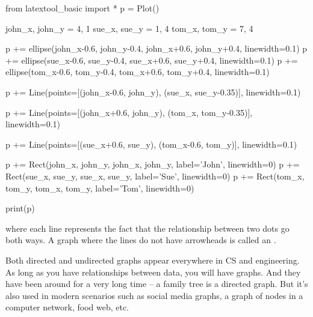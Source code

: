 \begin{python}
from latextool_basic import *
p = Plot()

john_x, john_y = 4, 1
sue_x, sue_y = 1, 4
tom_x, tom_y = 7, 4

p += ellipse(john_x-0.6, john_y-0.4, john_x+0.6, john_y+0.4, linewidth=0.1)
p += ellipse(sue_x-0.6, sue_y-0.4, sue_x+0.6, sue_y+0.4, linewidth=0.1)
p += ellipse(tom_x-0.6, tom_y-0.4, tom_x+0.6, tom_y+0.4, linewidth=0.1)

p += Line(points=[(john_x-0.6, john_y), (sue_x, sue_y-0.35)], linewidth=0.1)

p += Line(points=[(john_x+0.6, john_y), (tom_x, tom_y-0.35)], linewidth=0.1)

p += Line(points=[(sue_x+0.6, sue_y), (tom_x-0.6, tom_y)], linewidth=0.1)

p += Rect(john_x, john_y, john_x, john_y, label='John', linewidth=0)
p += Rect(sue_x, sue_y, sue_x, sue_y, label='Sue', linewidth=0)
p += Rect(tom_x, tom_y, tom_x, tom_y, label='Tom', linewidth=0)

print(p)
\end{python}

where each line represents the fact that the relationship between two dots go both ways. A graph where the lines do not have arrowheads is called an .

Both directed and undirected graphs appear everywhere in CS and engineering. As long as you have relationships between data, you will have graphs. And they have been around for a very long time -- a family tree is a directed graph. But it's also used in modern scenarios such as social media graphs, a graph of nodes in a computer network, food web, etc.

\newpage{}

